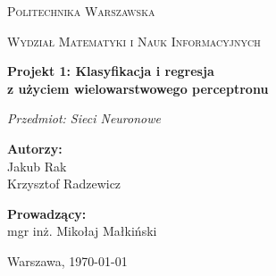 \documentclass[11pt,a4paper]{article}
\begin{document}
\begin{titlepage}
    \centering
    \vspace*{1.5cm}
    
    {\scshape\Large Politechnika Warszawska \par}
    \vspace{0.3cm}
    {\scshape\large Wydział Matematyki i Nauk Informacyjnych \par}
    
    \vspace{3.0cm}
    
    {\huge\bfseries Projekt 1: Klasyfikacja i regresja\\[0.3em]z użyciem wielowarstwowego perceptronu\par}
    
    \vspace{1.0cm}
    {\Large\itshape Przedmiot: Sieci Neuronowe \par}
    
    \vspace{3.5cm}
    
    \begin{minipage}[t]{0.48\textwidth}
        \flushleft
        \textbf{Autorzy:}\\[0.3em]
        Jakub Rak\\
        Krzysztof Radzewicz
    \end{minipage}
    \hfill
    \begin{minipage}[t]{0.48\textwidth}
        \flushright
        \textbf{Prowadzący:}\\[0.3em]
        mgr inż. Mikołaj Małkiński
    \end{minipage}
    \vfill
    
    {\large Warszawa, \today \par}
\end{titlepage}

\tableofcontents
\newpage

\end{document}
